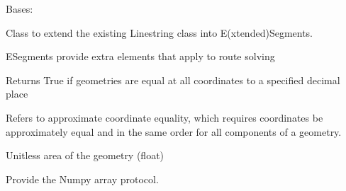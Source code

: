 \documentclass[letterpaper,10pt,english]{sphinxmanual}
\begin{document}

\begin{fulllineitems}
\label{\detokenize{reference:taipanPyRouter.ESegment}}
Bases: 

Class to extend the existing Linestring class into E(xtended)Segments.

ESegments provide extra elements that apply to route solving

\begin{fulllineitems}
\label{\detokenize{reference:taipanPyRouter.ESegment.almost_equals}}
Returns True if geometries are equal at all coordinates to a
specified decimal place

Refers to approximate coordinate equality, which requires coordinates be
approximately equal and in the same order for all components of a geometry.

\end{fulllineitems}


\begin{fulllineitems}
\label{\detokenize{reference:taipanPyRouter.ESegment.area}}
Unitless area of the geometry (float)

\end{fulllineitems}


\begin{fulllineitems}
\label{\detokenize{reference:taipanPyRouter.ESegment.array_interface}}
Provide the Numpy array protocol.

\end{fulllineitems}


\begin{fulllineitems}
\label{\detokenize{reference:taipanPyRouter.ESegment.array_interface_base}}
\end{fulllineitems}


\end{fulllineitems}
\end{document}
